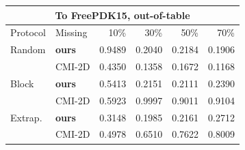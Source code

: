 \vspace{2pt}

\begin{tabular}{llrrrr}\toprule
\multicolumn{6}{c}{To FreePDK15, out-of-table} \\\midrule
Protocol & Missing & 10\% & 30\% & 50\% & 70\% \\\midrule
Random & \textbf{ours} & 0.9489 & 0.2040 & 0.2184 & 0.1906 \\
 & CMI-2D & 0.4350 & 0.1358 & 0.1672 & 0.1168 \\
\addlinespace
Block & \textbf{ours} & 0.5413 & 0.2151 & 0.2111 & 0.2390 \\
 & CMI-2D & 0.5923 & 0.9997 & 0.9011 & 0.9104 \\
\addlinespace
Extrap. & \textbf{ours} & 0.3148 & 0.1985 & 0.2161 & 0.2712 \\
 & CMI-2D & 0.4978 & 0.6510 & 0.7622 & 0.8009 \\
\bottomrule\end{tabular}
